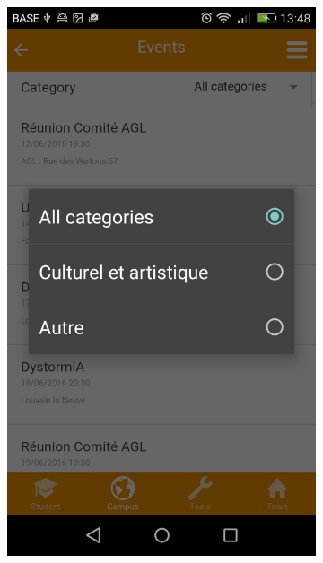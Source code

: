 \documentclass{eplmastersthesis}
\begin{document}
\begin{figure}
\begin{subfigure}[b]{0.3\textwidth}
        \includegraphics[width=\textwidth]{Images/Application_screens/Screenshot_2016-06-06-13-48-08.png}
    \end{subfigure}
    ~ %
    \begin{subfigure}[b]{0.3\textwidth}

\end{subfigure}
\end{figure}
\end{document}
